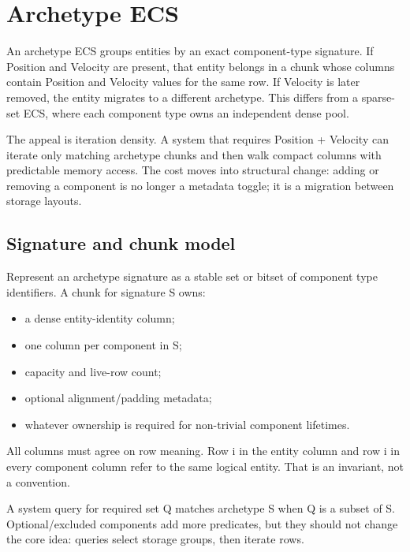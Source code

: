 \hypertarget{appendix-fbfeb0430008}{}\label{referencestart:appendix-fbfeb0430008}
\section{Archetype ECS}\label{appendix-fbfeb0430008-archetype-ecs}

An archetype ECS groups entities by an exact component-type signature. If Position and Velocity are present, that entity belongs in a chunk whose columns contain Position and Velocity values for the same row. If Velocity is later removed, the entity migrates to a different archetype. This differs from a sparse-set ECS, where each component type owns an independent dense pool.

The appeal is iteration density. A system that requires Position + Velocity can iterate only matching archetype chunks and then walk compact columns with predictable memory access. The cost moves into structural change: adding or removing a component is no longer a metadata toggle; it is a migration between storage layouts.

\subsection{Signature and chunk model}\label{appendix-fbfeb0430008-signature-and-chunk-model}

Represent an archetype signature as a stable set or bitset of component type identifiers. A chunk for signature S owns:

\begin{itemize}
\tightlist
\item
  a dense entity-identity column;
\item
  one column per component in S;
\item
  capacity and live-row count;
\item
  optional alignment/padding metadata;
\item
  whatever ownership is required for non-trivial component lifetimes.
\end{itemize}

All columns must agree on row meaning. Row i in the entity column and row i in every component column refer to the same logical entity. That is an invariant, not a convention.

A system query for required set Q matches archetype S when Q is a subset of S. Optional/excluded components add more predicates, but they should not change the core idea: queries select storage groups, then iterate rows.

